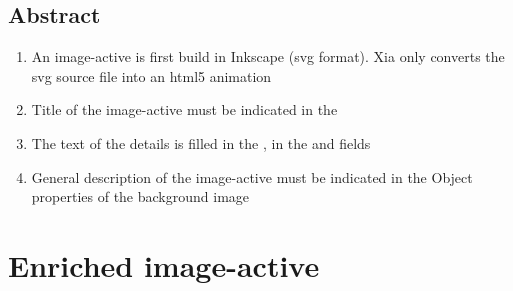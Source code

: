 

\subsection{Abstract}

\begin{enumerate}
 \item An image-active is first build in Inkscape (svg format). Xia only 
 converts the svg source file into an html5 animation
 \item Title of the image-active must be indicated in the 
 \item The text of the details is filled in the , 
 in the  and  fields
 \item General description of the image-active must be indicated in the \chemin
{Object properties} of the background image
\end{enumerate}

\section{Enriched image-active}

